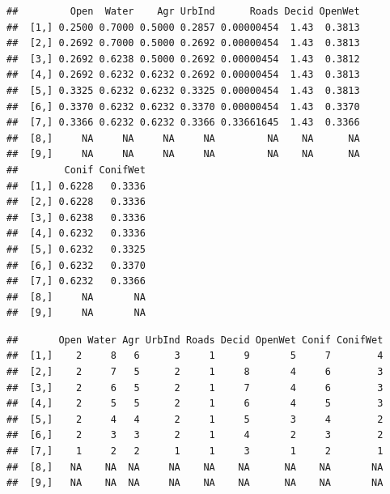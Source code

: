 \documentclass[12pt,]{book}
\newenvironment{Shaded}{\begin{snugshade}}{\end{snugshade}}
\newcommand{\CommentTok}[1]{\textcolor[rgb]{0.56,0.35,0.01}{\textit{#1}}}
\newcommand{\KeywordTok}[1]{\textcolor[rgb]{0.13,0.29,0.53}{\textbf{#1}}}
\newcommand{\NormalTok}[1]{#1}
\newcommand{\OperatorTok}[1]{\textcolor[rgb]{0.81,0.36,0.00}{\textbf{#1}}}
\begin{document}
\begin{verbatim}
##         Open  Water    Agr UrbInd      Roads Decid OpenWet
##  [1,] 0.2500 0.7000 0.5000 0.2857 0.00000454  1.43  0.3813
##  [2,] 0.2692 0.7000 0.5000 0.2692 0.00000454  1.43  0.3813
##  [3,] 0.2692 0.6238 0.5000 0.2692 0.00000454  1.43  0.3812
##  [4,] 0.2692 0.6232 0.6232 0.2692 0.00000454  1.43  0.3813
##  [5,] 0.3325 0.6232 0.6232 0.3325 0.00000454  1.43  0.3813
##  [6,] 0.3370 0.6232 0.6232 0.3370 0.00000454  1.43  0.3370
##  [7,] 0.3366 0.6232 0.6232 0.3366 0.33661645  1.43  0.3366
##  [8,]     NA     NA     NA     NA         NA    NA      NA
##  [9,]     NA     NA     NA     NA         NA    NA      NA
##        Conif ConifWet
##  [1,] 0.6228   0.3336
##  [2,] 0.6228   0.3336
##  [3,] 0.6238   0.3336
##  [4,] 0.6232   0.3336
##  [5,] 0.6232   0.3325
##  [6,] 0.6232   0.3370
##  [7,] 0.6232   0.3366
##  [8,]     NA       NA
##  [9,]     NA       NA
\end{verbatim}

\begin{Shaded}
\end{Shaded}

\begin{verbatim}
##       Open Water Agr UrbInd Roads Decid OpenWet Conif ConifWet
##  [1,]    2     8   6      3     1     9       5     7        4
##  [2,]    2     7   5      2     1     8       4     6        3
##  [3,]    2     6   5      2     1     7       4     6        3
##  [4,]    2     5   5      2     1     6       4     5        3
##  [5,]    2     4   4      2     1     5       3     4        2
##  [6,]    2     3   3      2     1     4       2     3        2
##  [7,]    1     2   2      1     1     3       1     2        1
##  [8,]   NA    NA  NA     NA    NA    NA      NA    NA       NA
##  [9,]   NA    NA  NA     NA    NA    NA      NA    NA       NA
\end{verbatim}

\begin{Shaded}
\end{Shaded}
\end{document}
